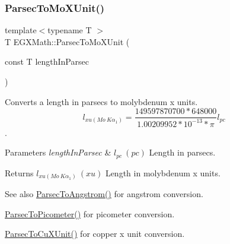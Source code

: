 \subsubsection{\texorpdfstring{Parsec\+To\+Mo\+X\+Unit()}{ParsecToMoXUnit()}}
{\footnotesize\ttfamily template$<$typename T $>$ \\
T E\+G\+X\+Math\+::\+Parsec\+To\+Mo\+X\+Unit (\begin{DoxyParamCaption}\item[{const T}]{length\+In\+Parsec }\end{DoxyParamCaption})}



Converts a length in parsecs to molybdenum x units. \[ l_{xu(Mo\ K\alpha_1)}=\frac{149597870700 * 648000}{1.00209952*10^{-13}* \pi} l_{pc}\]. 


\begin{DoxyParams}{Parameters}
{\em length\+In\+Parsec} & $ l_{pc}\ (pc)$ Length in parsecs. \\
\hline
\end{DoxyParams}
\begin{DoxyReturn}{Returns}
$ l_{xu(Mo\ K\alpha_1)}\ (xu)$ Length in molybdenum x units. 
\end{DoxyReturn}
\begin{DoxySeeAlso}{See also}
\mbox{\hyperlink{group___e_g_x_math-_conversions-_length_conversions-_astronomical-_parsec-_non-_s_i_gae9721658cb4d8b9e1cfd85f20d646702}{Parsec\+To\+Angstrom()}} for angstrom conversion. 

\mbox{\hyperlink{group___e_g_x_math-_conversions-_length_conversions-_astronomical-_parsec-_s_i_ga2d56b414320940d42a8956239e54c8b0}{Parsec\+To\+Picometer()}} for picometer conversion. 

\mbox{\hyperlink{group___e_g_x_math-_conversions-_length_conversions-_astronomical-_parsec-_non-_s_i_gad21a910de08e37197d58edf64c377222}{Parsec\+To\+Cu\+X\+Unit()}} for copper x unit conversion. 
\end{DoxySeeAlso}
